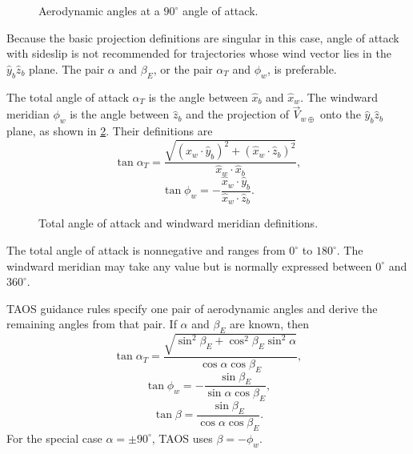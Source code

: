 \begin{figure}[htbp]
  \centering
  \resizebox{0.66\linewidth}{!}{}
  \caption{Aerodynamic angles at a $90^\circ$ angle of attack.}
  \label{fig:aero-angles-at-90-alpha}
\end{figure}

Because the basic projection definitions are singular in this case, angle of attack
with sideslip is not recommended for trajectories whose wind vector lies in the
$\hat y_b\hat z_b$ plane. The pair $\alpha$ and $\beta_E$, or the pair
$\alpha_T$ and $\phi_w$, is preferable.


The total angle of attack $\alpha_T$ is the angle between $\hat x_b$ and
$\hat x_w$. The windward meridian $\phi_w$ is the angle between $\hat z_b$ and
the projection of $\vec V_{w\oplus}$ onto the $\hat y_b\hat z_b$ plane, as shown
in \cref{fig:total-alpha-windward-meridian}. Their definitions are
\begin{equation}
  \tan\alpha_T
  =\frac{\sqrt{(\hat x_w\mathbin{\cdot}\hat y_b)^2
                  +(\hat x_w\mathbin{\cdot}\hat z_b)^2}}
  {\hat x_w\mathbin{\cdot}\hat x_b},
  \label{eq:total-angle-of-attack}
\end{equation}
\begin{equation}
  \tan\phi_w
  =-\frac{\hat x_w\mathbin{\cdot}\hat y_b}
  {\hat x_w\mathbin{\cdot}\hat z_b}.
  \label{eq:windward-meridian}
\end{equation}

\begin{figure}[htbp]
  \centering
  \resizebox{0.78\linewidth}{!}{}
  \caption{Total angle of attack and windward meridian definitions.}
  \label{fig:total-alpha-windward-meridian}
\end{figure}

The total angle of attack is nonnegative and ranges from $0^\circ$ to $180^\circ$.
The windward meridian may take any value but is normally expressed between
$0^\circ$ and $360^\circ$.


TAOS guidance rules specify one pair of aerodynamic angles and derive the remaining
angles from that pair. If $\alpha$ and $\beta_E$ are known, then
\begin{equation}
  \tan\alpha_T
  =\frac{\sqrt{\sin^2\beta_E
      +\cos^2\beta_E\sin^2\alpha}}
  {\cos\alpha\cos\beta_E},
  \label{eq:alpha-betae-to-total-alpha}
\end{equation}
\begin{equation}
  \tan\phi_w
  =-\frac{\sin\beta_E}
  {\sin\alpha\cos\beta_E},
  \label{eq:alpha-betae-to-windward-meridian}
\end{equation}
\begin{equation}
  \tan\beta
  =\frac{\sin\beta_E}
  {\cos\alpha\cos\beta_E}.
  \label{eq:alpha-betae-to-beta}
\end{equation}
For the special case $\alpha=\pm90^\circ$, TAOS uses $\beta=-\phi_w$.

